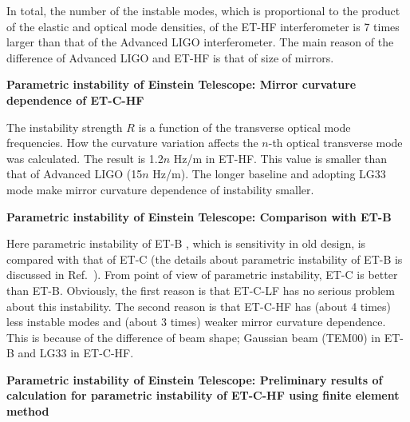 In total, the number of the instable modes, which is proportional
to the product of the elastic and optical mode densities, of the
ET-HF interferometer is 7 times larger than that of the Advanced LIGO interferometer. 
The main reason of the difference of Advanced LIGO and ET-HF is that of size of mirrors. 

\textbf{Parametric instability of Einstein Telescope: Mirror curvature dependence of ET-C-HF}
\nopagebreak

The instability strength $R$ is a function of the transverse optical
mode frequencies. How the curvature variation affects
the $n$-th optical transverse mode was calculated.
The result is 1.2$n$ Hz/m in ET-HF. This value is smaller than that of 
Advanced LIGO (15$n$ Hz/m). The longer baseline and adopting LG33 mode 
make mirror curvature dependence of instability smaller. 

\textbf{Parametric instability of Einstein Telescope: Comparison with ET-B}
\nopagebreak

Here parametric instability of ET-B \cite{HildETconventional}, which is sensitivity in old design, 
is compared with that of ET-C (the details about parametric instability of ET-B is 
discussed in Ref.~\cite{Yamamoto2009}). 
From point of view of parametric instability, ET-C is better than ET-B.
Obviously, the first reason is that ET-C-LF has no serious problem about this instability. 
The second reason is that ET-C-HF has (about 4 times) less instable modes and (about 3 times) 
weaker mirror curvature dependence.
This is because of the difference of beam shape; Gaussian beam (TEM00) in ET-B and LG33 in ET-C-HF. 

\textbf{Parametric instability of Einstein Telescope: Preliminary results of calculation for parametric instability of ET-C-HF using finite element method}
\nopagebreak



